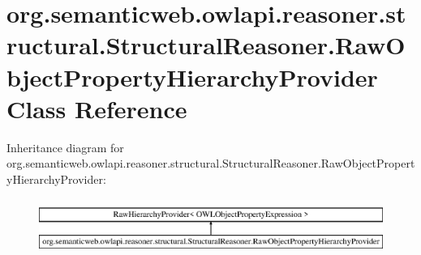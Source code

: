 \hypertarget{classorg_1_1semanticweb_1_1owlapi_1_1reasoner_1_1structural_1_1_structural_reasoner_1_1_raw_object_property_hierarchy_provider}{\section{org.\-semanticweb.\-owlapi.\-reasoner.\-structural.\-Structural\-Reasoner.\-Raw\-Object\-Property\-Hierarchy\-Provider Class Reference}
\label{classorg_1_1semanticweb_1_1owlapi_1_1reasoner_1_1structural_1_1_structural_reasoner_1_1_raw_object_property_hierarchy_provider}
}
Inheritance diagram for org.\-semanticweb.\-owlapi.\-reasoner.\-structural.\-Structural\-Reasoner.\-Raw\-Object\-Property\-Hierarchy\-Provider\-:\begin{figure}[H]
\begin{center}
\leavevmode
\includegraphics[height=1.866667cm]{classorg_1_1semanticweb_1_1owlapi_1_1reasoner_1_1structural_1_1_structural_reasoner_1_1_raw_object_property_hierarchy_provider}
\end{center}
\end{figure}
